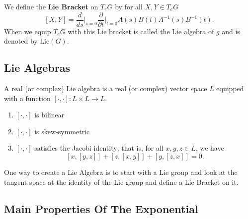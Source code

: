 We define the \textbf{Lie Bracket} on \( {T}_{e}G \) by for all \( X,Y \in {T}_{e}G \)
\[  [X,Y] = \frac{ d }{ ds } \Big|_{s = 0} \frac{ \partial  }{ \partial t  }  \Big|_{t = 0} A(s) B(t) A^{-1}(s) B^{-1}(t).\]
When we equip \( {T}_{e}G  \) with this Lie bracket is called the Lie algebra of \( g  \) and is denoted by \( \text{Lie}(G) \).

\subsection{Lie Algebras}

\begin{definition}
    A real (or complex) Lie algebra is a real (or complex) vector space \( L \) equipped with a function \( [\cdot, \cdot ] : L \times L \to L  \).
    \begin{enumerate}
        \item[(i)] \( [\cdot, \cdot]  \) is bilinear 
        \item[(ii)] \( [\cdot, \cdot]  \) is skew-symmetric
        \item[(iii)] \( [\cdot, \cdot]  \) satisfies the Jacobi identity; that is, for all \( x,y,z \in L \), we have 
            \[  [x,[y,z]] + [z,[x,y]] + [y, [z,x]] = 0.  \]
    \end{enumerate}
\end{definition}

One way to create a Lie Algebra is to start with a Lie group and look at the tangent space at the identity of the Lie group and define a Lie Bracket on it.

\subsection{Main Properties Of The Exponential}

